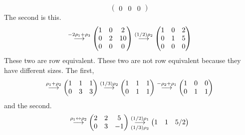 \begin{exercises}
\begin{answer}
\begin{exparts}
\begin{equation*}
\begin{pmatrix}
              0  &0  &0
            \end{pmatrix}
          \end{equation*}
          The second is this.
          \begin{equation*}
            \grstep{-2\rho_1+\rho_3}
            \begin{pmatrix}
              1  &0  &2  \\
              0  &2  &10 \\
              0  &0  &0
            \end{pmatrix}
            \grstep{(1/2)\rho_2}
            \begin{pmatrix}
              1  &0  &2  \\
              0  &1  &5  \\
              0  &0  &0
            \end{pmatrix}
          \end{equation*}
          These two are row equivalent.
        \partsitem These two are not row equivalent because they have different
          sizes.
        \partsitem The first,
          \begin{equation*}
            \grstep{\rho_1+\rho_2}
            \begin{pmatrix}
              1  &1  &1  \\
              0  &3  &3
            \end{pmatrix}
            \grstep{(1/3)\rho_2}
            \begin{pmatrix}
              1  &1  &1  \\
              0  &1  &1
            \end{pmatrix}
            \grstep{-\rho_2+\rho_1}
            \begin{pmatrix}
              1  &0  &0  \\
              0  &1  &1
            \end{pmatrix}
          \end{equation*}
          and the second.
          \begin{equation*}
            \grstep{\rho_1\leftrightarrow\rho_2}
            \begin{pmatrix}
              2  &2  &5  \\
              0  &3  &-1
            \end{pmatrix}
            \grstep[(1/3)\rho_2]{(1/2)\rho_1}
            \begin{pmatrix}
              1  &1  &5/2 \\

\end{pmatrix}
\end{equation*}
\end{exparts}
\end{answer}
\end{exercises}
